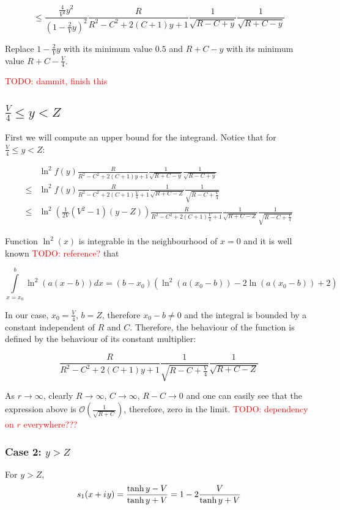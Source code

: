 \documentclass[12pt, a4paper]{article}
\newcommand{\mcO}{\mathcal{O}}
\newcommand{\iu}{{i\mkern1mu}}
\newcommand{\todo}[1]{{\large \textcolor{red}{TODO: #1}}}
\begin{document}
\[
\le \frac{\frac{4}{V^2}y^2}{(1 - \frac{2}{V}y)^2} \frac{R}{R^2 - C^2 + 2 (C + 1) y + 1} \frac{1}{\sqrt{R - C + y}} \frac{1}{\sqrt{R + C - y}}
\]

Replace $1 - \frac{2}{V}y$ with its minimum value $0.5$ and $R + C - y$ with its minimum value $R + C - \frac{V}{4}$.

\todo{dammit, finish this}

\subsection*{$\frac{V}{4} \le y < Z$}

First we will compute an upper bound for the integrand. Notice that for $\frac{V}{4} \le y < Z$:

\begin{align*}
    & \ln^2 f(y) \frac{R}{R^2 - C^2 + 2 (C + 1) y + 1} \frac{1}{\sqrt{R + C - y}} \frac{1}{\sqrt{R - C + y}} 
\\ \le & \ln^2 f(y) \frac{R}{R^2 - C^2 + 2 (C + 1) \frac{V}{4} + 1} \frac{1}{\sqrt{R + C - Z}} \frac{1}{\sqrt{R - C + \frac{V}{4}}}
\\ \le & \ln^2 \left( \frac{1}{2 V}(V^2 - 1) (y - Z) \right) \frac{R}{R^2 - C^2 + 2 (C + 1) \frac{V}{4} + 1} \frac{1}{\sqrt{R + C - Z}} \frac{1}{\sqrt{R - C + \frac{V}{4}}}
\end{align*}

Function $\ln^2(x)$ is integrable in the neighbourhood of $x = 0$ and it is well known \todo{reference?} that

\[
\int\limits_{x=x_0}^b \ln^2(a (x - b)) dx = (b - x_0) (\ln^2(a (x_0 - b)) - 2 \ln(a (x_0 - b)) + 2)
\]

In our case, $x_0 = \frac{V}{4}$, $b = Z$, therefore $x_0 - b \ne 0$ and the integral is bounded by a constant independent of $R$ and $C$. Therefore, the behaviour of the function is defined by the behaviour of its constant multiplier:

\[
\frac{R}{R^2 - C^2 + 2 (C + 1) y + 1} \frac{1}{\sqrt{R - C + \frac{V}{4}}} \frac{1}{\sqrt{R + C - Z}}
\]

As $r \to \infty$, clearly $R \to \infty$, $C \to \infty$, $R - C \to 0$ and one can easily see that the expression above is $\mcO(\frac{1}{\sqrt{R + C}})$, therefore, zero in the limit. \todo{dependency on $r$ everywhere???}

\subsubsection*{Case 2: $y > Z$}
For $y > Z$, 
\[
s_1(x + \iu y) 
 = \frac{\tanh y - V}{\tanh y + V}
 = 1 - 2 \frac{V}{\tanh y + V}
\]
\end{document}
